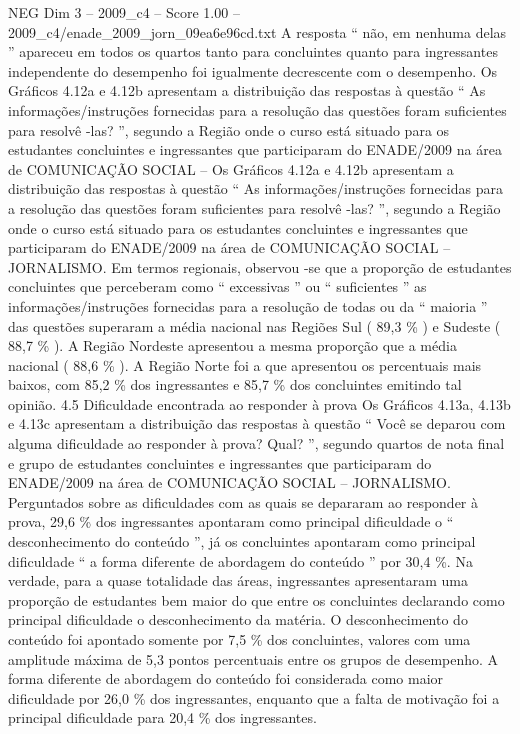 \begin{textsample}{NEG Dim 3 – 2009\_c4 – Score 1.00 – 2009\_c4/enade\_2009\_jorn\_09ea6e96cd.txt}
A resposta “ não, em nenhuma delas ” apareceu em todos os quartos tanto para concluintes quanto para ingressantes independente do desempenho foi igualmente decrescente com o desempenho.
Os Gráficos 4.12a e 4.12b apresentam a distribuição das respostas à questão “ As informações/instruções fornecidas para a resolução das questões foram suficientes para resolvê -las? ”, segundo a Região onde o curso está situado para os estudantes concluintes e ingressantes que participaram do ENADE/2009 na área de COMUNICAÇÃO SOCIAL – Os Gráficos 4.12a e 4.12b apresentam a distribuição das respostas à questão “ As informações/instruções fornecidas para a resolução das questões foram suficientes para resolvê -las? ”, segundo a Região onde o curso está situado para os estudantes concluintes e ingressantes que participaram do ENADE/2009 na área de COMUNICAÇÃO SOCIAL – JORNALISMO.
Em termos regionais, observou -se que a proporção de estudantes concluintes que perceberam como “ excessivas ” ou “ suficientes ” as informações/instruções fornecidas para a resolução de todas ou da “ maioria ” das questões superaram a média nacional nas Regiões Sul ( 89,3 \% ) e Sudeste ( 88,7 \% ).
A Região Nordeste apresentou a mesma proporção que a média nacional ( 88,6 \% ).
A Região Norte foi a que apresentou os percentuais mais baixos, com 85,2 \% dos ingressantes e 85,7 \% dos concluintes emitindo tal opinião. 4.5 Dificuldade encontrada ao responder à prova Os Gráficos 4.13a, 4.13b e 4.13c apresentam a distribuição das respostas à questão “ Você se deparou com alguma dificuldade ao responder à prova?
Qual? ”, segundo quartos de nota final e grupo de estudantes concluintes e ingressantes que participaram do ENADE/2009 na área de COMUNICAÇÃO SOCIAL – JORNALISMO.
Perguntados sobre as dificuldades com as quais se depararam ao responder à prova, 29,6 \% dos ingressantes apontaram como principal dificuldade o “ desconhecimento do conteúdo ”, já os concluintes apontaram como principal dificuldade “ a forma diferente de abordagem do conteúdo ” por 30,4 \%.
Na verdade, para a quase totalidade das áreas, ingressantes apresentaram uma proporção de estudantes bem maior do que entre os concluintes declarando como principal dificuldade o desconhecimento da matéria.
O desconhecimento do conteúdo foi apontado somente por 7,5 \% dos concluintes, valores com uma amplitude máxima de 5,3 pontos percentuais entre os grupos de desempenho.
A forma diferente de abordagem do conteúdo foi considerada como maior dificuldade por 26,0 \% dos ingressantes, enquanto que a falta de motivação foi a principal dificuldade para 20,4 \% dos ingressantes.

\end{textsample}

